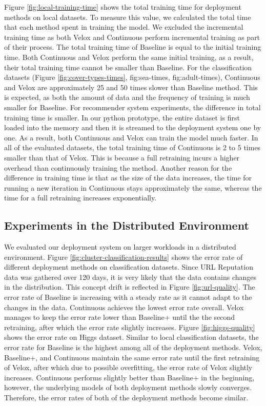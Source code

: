 \documentclass{vldb}
\begin{document}
Figure \ref{fig:local-training-time} shows the total training time for deployment methods on local datasets.
To measure this value, we calculated the total time that each method spent in training the model.
We excluded the incremental training time as both Velox and Continuous perform incremental training as part of their process.
The total training time of Baseline is equal to the initial training time.
Both Continuous and Velox perform the same initial training, as a result, their total training time cannot be smaller than Baseline.
For the classification datasets (Figure \ref{fig:cover-types-times}, {fig:sea-times}, {fig:adult-times}), Continuous and Velox are approximately 25 and 50 times slower than Baseline method.
This is expected, as both the amount of data and the frequency of training is much smaller for Baseline.
For recommender system experiments, the difference in total training time is smaller.
In our python prototype, the entire dataset is first loaded into the memory and then it is streamed to the deployment system one by one.
As a result, both Continuous and Velox can train the model much faster.
In all of the evaluated datasets, the total training time of Continuous is 2 to 5 times smaller than that of Velox.
This is because a full retraining incurs a higher overhead than continuously training the method.
Another reason for the difference in training time is that as the size of the data increases, the time for running a new iteration in Continuous stays approximately the same, whereas the time for a full retraining increases exponentially.

\subsection{Experiments in the Distributed Environment}
We evaluated our deployment system on larger workloads in a distributed environment.
Figure \ref{fig:cluster-classification-results} shows the error rate of different deployment methods on classification datasets.
Since URL Reputation data was gathered over 120 days, it is very likely that the data contains changes in the distribution.
This concept drift is reflected in Figure \ref{fig:url-quality}.
The error rate of Baseline is increasing with a steady rate as it cannot adapt to the changes in the data.
Continuous achieves the lowest error rate overall.
Velox manages to keep the error rate lower than Baseline+ until the the second retraining, after which the error rate slightly increases. 
Figure \ref{fig:higgs-quality} shows the error rate on Higgs dataset.
Similar to local classification datasets, the error rate for Baseline is the highest among all of the deployment methods.
Velox, Baseline+, and Continuous maintain the same error rate until the first retraining of Velox, after which due to possible overfitting, the error rate of Velox slightly increases.
Continuous performs slightly better than Baseline+ in the beginning, however, the underlying models of both deployment methods slowly converges.
Therefore, the error rates of both of the deployment methods become similar.
\end{document}
